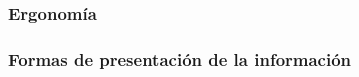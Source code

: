 \subsubsection{Ergonom\'ia}
\label{sec:ergonomia}




\subsubsection{Formas de presentaci\'on de la informaci\'on}
\label{sec:formas.presentacion.informacion}

